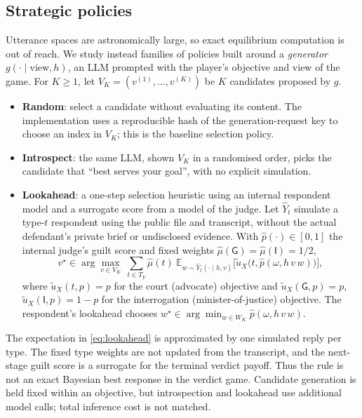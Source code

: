 \documentclass[10pt,a4paper]{article}
\theoremstyle{remark}
\newcommand{\E}{\mathbb{E}}
\newcommand{\G}{\mathsf{G}}
\newcommand{\I}{\mathsf{I}}
\begin{document}
\subsection{Strategic policies}\label{sec:policies}
Utterance spaces are astronomically large, so exact equilibrium computation is out of reach. We study instead families
of policies built around a \emph{generator} $g(\cdot\mid\text{view},h)$, an LLM prompted with the player's objective
and view of the game. For $K\ge1$, let $V_K=(v^{(1)},\dots,v^{(K)})$ be $K$ candidates proposed by $g$.
\begin{itemize}
  \item \textbf{Random}: select a candidate without evaluating its content. The implementation uses a reproducible
  hash of the generation-request key to choose an index in $V_K$; this is the baseline selection policy.
  \item \textbf{Introspect}: the same LLM, shown $V_K$ in a randomised order, picks the candidate that ``best serves
  your goal'', with no explicit simulation.
  \item \textbf{Lookahead}: a one-step selection heuristic using an internal respondent model and a surrogate
  score from a model of the judge. Let $\hat Y_t$ simulate a type-$t$ respondent using the public file and transcript,
  without the actual defendant's private brief or undisclosed evidence. With
  $\hat p(\cdot)\in[0,1]$ the internal judge's guilt score and fixed weights $\hat\mu(\G)=\hat\mu(\I)=1/2$,
  \begin{equation}\label{eq:lookahead}
  v^\star\in\arg\max_{v\in V_K}\ \sum_{t\in T_Y}\hat\mu(t)\ \E_{w\sim\hat Y_t(\cdot\mid h,v)}\Big[\tilde u_X\big(t,\hat p(\omega,h\,v\,w)\big)\Big],
  \end{equation}
  where $\tilde u_X(t,p)=p$ for the court (advocate) objective and $\tilde u_X(\G,p)=p$, $\tilde u_X(\I,p)=1-p$ for
  the interrogation (minister-of-justice) objective. The respondent's lookahead chooses
  $w^\star\in\arg\min_{w\in W_K}\hat p(\omega,h\,v\,w)$.
\end{itemize}
The expectation in \cref{eq:lookahead} is approximated by one simulated reply per type. The fixed type weights
are not updated from the transcript, and the next-stage guilt score is a surrogate for the terminal verdict payoff.
Thus the rule is not an exact Bayesian best response in the verdict game. Candidate generation is held fixed
within an objective, but introspection and lookahead use additional model calls; total inference cost is not matched.
\end{document}
